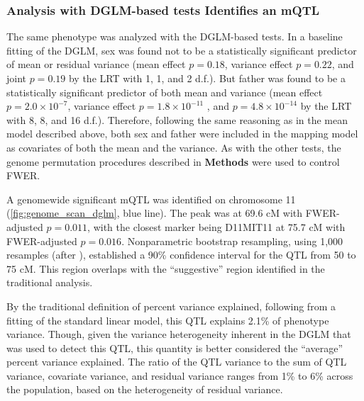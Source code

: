 \subsubsection{Analysis with DGLM-based tests Identifies an mQTL}
The same phenotype was analyzed with the DGLM-based tests.
In a baseline fitting of the DGLM, sex was found not to be a statistically significant predictor of mean or residual variance (mean effect $p = 0.18$, variance effect $p = 0.22$, and joint $p = 0.19$ by the LRT with 1, 1, and 2 d.f.).
But father was found to be a statistically significant predictor of both mean and variance (mean effect $p = 2.0 \times 10^{-7}$, variance effect $p = 1.8 \times 10^{-11}$ , and $p = 4.8 \times 10^{-14}$ by the LRT with 8, 8, and 16 d.f.).
Therefore, following the same reasoning as in the mean model described above, both sex and father were included in the mapping model as covariates of both the mean and the variance.
As with the other tests, the genome permutation procedures described in \textbf{Methods} were used to control FWER.

A genomewide significant mQTL was identified on chromosome 11 (\autoref{fig:genome_scan_dglm}, blue line).
The peak was at 69.6 cM with FWER-adjusted $p=0.011$, with the closest marker being D11MIT11 at 75.7 cM with FWER-adjusted $p=0.016$.
Nonparametric bootstrap resampling, using 1,000 resamples (after \citealt{Visscher1996}), established a 90\% confidence interval for the QTL from 50 to 75 cM.
This region overlaps with the ``suggestive'' region identified in the traditional analysis.

By the traditional definition of percent variance explained, following from a fitting of the standard linear model, this QTL explains 2.1\% of phenotype variance.
Though, given the variance heterogeneity inherent in the DGLM that was used to detect this QTL, this quantity is better considered the ``average'' percent variance explained.
The ratio of the QTL variance to the sum of QTL variance, covariate variance, and residual variance ranges from 1\% to 6\% across the population, based on the heterogeneity of residual variance.


